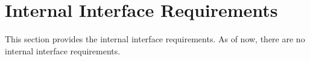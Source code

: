 \KNEADSECTIONNEWPAGE
\section{Internal Interface Requirements}
\label{lab:sec_InternalInterfaceRequirements}
% 


This section provides the internal interface requirements. As of now, there are no internal interface requirements.


